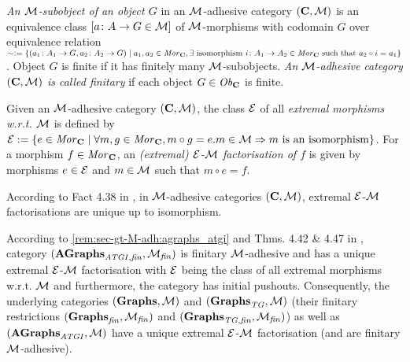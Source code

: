 \begin{definition}
\emph{An ${\cal M}$-subobject of an object $G$} in an ${\cal M}$-adhesive category $(\mathbf{C},{\cal M})$ is an equivalence class $[a\colon A \to G \in {\cal M}]$ of ${\cal M}$-morphisms with codomain $G$ over equivalence relation $\sim:=\{(a_1\colon A_1 \to G,a_2\colon A_2 \to G) \mid a_1,a_2 \in \mathit{Mor}_\mathbf{C},\exists \text{ isomorphism } i\colon A_1 \to A_2 \in \mathit{Mor}_\mathbf{C} \text{ such that } a_2 \circ i=a_1\}$.
Object $G$ is finite if it has finitely many ${\cal M}$-subobjects.
\emph{An ${\cal M}$-adhesive category $(\mathbf{C},{\cal M})$ is called finitary} if each object $G \in \mathit{Ob}_\mathbf{C}$ is finite.
\envEndMarker
\end{definition}

\begin{definition}
\label{def:EMFactorisation}
Given an ${\cal M}$-adhesive category $(\mathbf{C},{\cal M})$, the class $\mathcal{E}$ of all \emph{extremal morphisms w.r.t. ${\cal M}$} is defined by $\mathcal{E} := \{e \in \mathit{Mor}_\mathbf{C} \mid \forall m,g \in \mathit{Mor}_\mathbf{C}, m \circ g=e.m \in {\cal M} \Rightarrow m \text{ is an isomorphism}\}$.
For a morphism $f \in \mathit{Mor}_\mathbf{C}$, an \emph{(extremal) $\mathcal{E}$-${\cal M}$ factorisation of $f$} is given by morphisms $e \in \mathcal{E}$ and $m \in {\cal M}$ such that $m \circ e=f$.
\envEndMarker
\end{definition}

\begin{remark}
\label{rem:sec-gt-M-adh:uniq_extr_EM_fact}
According to Fact 4.38 in \cite{FAGT2}, in ${\cal M}$-adhesive categories $(\mathbf{C},{\cal M})$, extremal $\mathcal{E}$-${\cal M}$ factorisations are unique up to isomorphism.
\envEndMarker
\end{remark}

\begin{remark}
\label{rem:sec-gt-M-adh:agraphs_atgi_fin}
According to \cref{rem:sec-gt-M-adh:agraphs_atgi} and Thms. 4.42 \& 4.47 in \cite{FAGT2}, category $(\mathbf{AGraphs}_{\mathit{ATGI},\mathit{fin}},{\cal M}_\mathit{fin})$ is finitary ${\cal M}$-adhesive and has a unique extremal $\mathcal{E}$-${\cal M}$ factorisation with $\mathcal{E}$ being the class of all extremal morphisms w.r.t. ${\cal M}$ and furthermore, the category has initial pushouts.
Consequently, the underlying categories $(\mathbf{Graphs},{\cal M})$ and $(\mathbf{Graphs}_\mathit{TG},{\cal M})$ (their finitary restrictions $(\mathbf{Graphs}_\mathit{fin},{\cal M}_\mathit{fin})$ and $(\mathbf{Graphs}_{\mathit{TG},\mathit{fin}},{\cal M}_\mathit{fin})$) as well as $(\mathbf{AGraphs}_\mathit{ATGI},{\cal M})$ have a unique extremal $\mathcal{E}$-${\cal M}$ factorisation (and are finitary ${\cal M}$-adhesive).
\envEndMarker
\end{remark}

